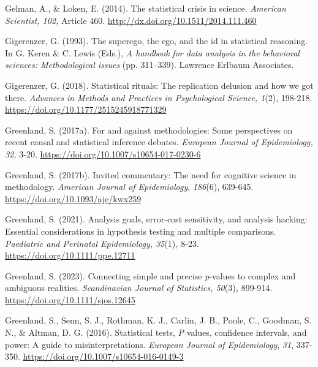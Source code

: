 \documentclass[authordate, empirical]{jote-new-article}
\begin{document}
	Gelman, A., \& Loken, E. (2014). The statistical crisis in science. \emph{American Scientist, 102,} Article 460. \href{http://www.google.com/url?q=http%3A%2F%2Fdx.doi.org%2F10.1511%2F2014.111.460&amp;sa=D&amp;sntz=1&amp;usg=AFQjCNHR0KgWDzAsR3DARSGVOIw6Y9k40g}{http://dx.doi.org/10.1511/2014.111.460}



	Gigerenzer, G. (1993). The superego, the ego, and the id in statistical reasoning. In G. Keren \& C. Lewis (Eds.), \emph{A handbook for data analysis in the behavioral sciences: Methodological issues} (pp. 311--339). Lawrence Erlbaum Associates.



	Gigerenzer, G. (2018). Statistical rituals: The replication delusion and how we got there. \emph{Advances in Methods and Practices in Psychological Science, 1}(2), 198-218. \href{https://doi.org/10.1177/2515245918771329}{https://doi.org/10.1177/2515245918771329}



	Greenland, S. (2017a). For and against methodologies: Some perspectives on recent causal and statistical inference debates. \emph{European Journal of Epidemiology, 32,} 3-20. \href{https://doi.org/10.1007/s10654-017-0230-6}{https://doi.org/10.1007/s10654-017-0230-6}



	Greenland, S. (2017b). Invited commentary: The need for cognitive science in methodology. \emph{American Journal of Epidemiology}, \emph{186}(6), 639-645. \href{https://doi.org/10.1093/aje/kwx259}{https://doi.org/10.1093/aje/kwx259}



	Greenland, S. (2021). Analysis goals, error-cost sensitivity, and analysis hacking: Essential considerations in hypothesis testing and multiple comparisons. \emph{Paediatric and Perinatal Epidemiology, 35}(1)\emph{, }8-23. \href{https://doi.org/10.1111/ppe.12711}{https://doi.org/10.1111/ppe.12711}



	Greenland, S. (2023). Connecting simple and precise \emph{p}-values to complex and ambiguous realities. \emph{Scandinavian Journal of Statistics, 50}(3)\emph{,} 899-914. \href{https://doi.org/10.1111/sjos.12645}{https://doi.org/10.1111/sjos.12645}



	Greenland, S., Senn, S. J., Rothman, K. J., Carlin, J. B., Poole, C., Goodman, S. N., \& Altman, D. G. (2016). Statistical tests, \emph{P} values, confidence intervals, and power: A guide to misinterpretations. \emph{European Journal of Epidemiology}, \emph{31}, 337-350. \href{https://doi.org/10.1007/s10654-016-0149-3}{https://doi.org/10.1007/s10654-016-0149-3}
\end{document}
